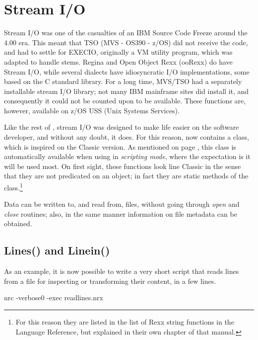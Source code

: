 \chapter{Stream I/O}\label{refstreamio}

 Stream I/O was one of the casualties of
an IBM Source Code Freeze around the \Rexx{} 4.00 era. This meant that
TSO (MVS - OS390 - z/OS) \Rexx{} did not receive the code, and had to settle for EXECIO, originally a VM utility program, which was adapted to handle \Rexx{} stems. Regina and Open Object Rexx (ooRexx) do have Stream I/O, while several dialects have idiosyncratic I/O implementations, some based on the C standard library. For a long time, MVS/TSO had a separately installable stream I/O library; not many IBM mainframe sites did install it, and consequently it could not be counted upon to be available. These functions are, however, available on z/OS USS (Unix Systems Services).

Like the rest of \Rexx{}, stream I/O was designed to make life easier on the software developer, and without any doubt, it does. For this reason, \nr{} now contains a  class, which is inspired on the Classic \Rexx version. As mentioned on page \pageref{refscripting}, this class is automatically available when using \nr{} in \emph{scripting mode}, where the expectation is it will be used most. On first sight, these functions look line Classic \Rexx{} in the sense that they are not predicated on an object; in fact they are static methods of the  class.\footnote{For this reason they are listed in the list of Rexx string functions in the \nr{} Language Reference, but explained in their own chapter of that manual.}

Data can be written to, and read from, files, without going through \emph{open} and \emph{close} routines; also, in the same manner information on file metadata can be obtained.

\section{Lines() and Linein()}
As an example, it is now possible to write a very short script that reads lines from a file for inspecting or transforming their content, in a few lines.



\begin{shaded}
\bash[stdout]
nrc -verbose0 -exec readlines.nrx
\END
\end{shaded}

